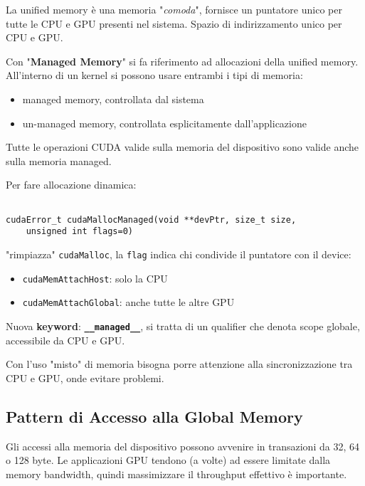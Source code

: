 
La unified memory è una memoria "\textit{comoda}", fornisce un puntatore unico per tutte le CPU e GPU presenti nel sistema. Spazio di indirizzamento unico per CPU e GPU.

Con "\textbf{Managed Memory}" si fa riferimento ad allocazioni della unified memory. All'interno di un kernel si possono usare entrambi i tipi di memoria: 
\begin{itemize}
	\item managed memory, controllata dal sistema
    
	\item un-managed memory, controllata esplicitamente dall'applicazione
\end{itemize}

Tutte le operazioni CUDA valide sulla memoria del dispositivo sono valide anche sulla memoria managed.

Per fare allocazione dinamica:
\begin{lstlisting}

cudaError_t cudaMallocManaged(void **devPtr, size_t size, 
    unsigned int flags=0)
\end{lstlisting}

"rimpiazza" \texttt{cudaMalloc}, la \texttt{flag} indica chi condivide il puntatore con il device:
\begin{itemize}
	\item \texttt{cudaMemAttachHost}: solo la CPU
    
	\item \texttt{cudaMemAttachGlobal}: anche tutte le altre GPU
\end{itemize}

Nuova \textbf{keyword}: \textbf{\texttt{\_\_managed\_\_}}, si tratta di un qualifier che denota scope globale, accessibile da CPU e GPU.

Con l'uso "misto" di memoria bisogna porre attenzione alla sincronizzazione tra CPU e GPU, onde evitare problemi.

\subsection{Pattern di Accesso alla Global Memory}

Gli accessi alla memoria del dispositivo possono avvenire in transazioni da 32, 64 o 128 byte. Le applicazioni GPU tendono (a volte) ad essere limitate dalla memory bandwidth, quindi massimizzare il throughput effettivo è importante. 

